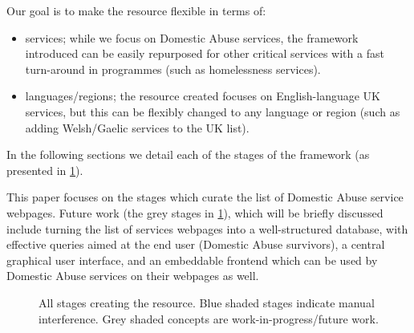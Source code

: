 \documentclass[conference]{IEEEtran}
\begin{document}
Our goal is to make the resource flexible in terms of:
\begin{itemize}
    \item services; while we focus on Domestic Abuse services, the framework introduced can be easily repurposed for other critical services with a fast turn-around in programmes (such as homelessness services).
    \item languages/regions; the resource created focuses on English-language UK services, but this can be flexibly changed to any language or region (such as adding Welsh/Gaelic services to the UK list).
\end{itemize}
In the following sections we detail each of the stages of the framework (as presented in \cref{fig:stages}).

This paper focuses on the stages which curate the list of Domestic Abuse service webpages.
Future work (the grey stages in \cref{fig:stages}), which will be briefly discussed include turning the list of services webpages into a well-structured database, with effective queries aimed at the end user (Domestic Abuse survivors), a central graphical user interface, and an embeddable frontend which can be used by Domestic Abuse services on their webpages as well.

\begin{figure}
\begin{center}
\caption{All stages creating the resource. Blue shaded stages indicate manual interference. Grey shaded concepts are work-in-progress/future work.}
\label{fig:stages}
\end{center}
\end{figure}
\end{document}
